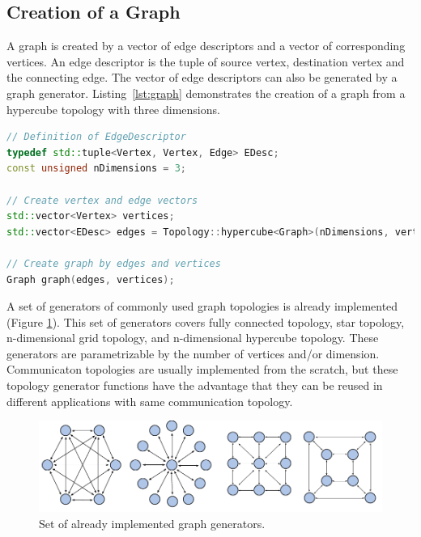 \subsection{Creation of a Graph}
A graph is created by a vector of edge descriptors and a vector of
corresponding vertices. An edge descriptor is the tuple of source
vertex, destination vertex and the connecting edge. The vector of edge
descriptors can also be generated by a graph
generator. Listing~\ref{lst:graph} demonstrates the creation of a graph from
a hypercube topology with three dimensions.

\begin{lstlisting}[language=C++, label=lst:graph, caption={\ }]
// Definition of EdgeDescriptor
typedef std::tuple<Vertex, Vertex, Edge> EDesc;
const unsigned nDimensions = 3;

// Create vertex and edge vectors
std::vector<Vertex> vertices;
std::vector<EDesc> edges = Topology::hypercube<Graph>(nDimensions, vertices);

// Create graph by edges and vertices
Graph graph(edges, vertices);

\end{lstlisting}

\noindent A set of generators of commonly used graph topologies is
already implemented (Figure \ref{fig:topologies}).  This set of
generators covers fully connected topology, star topology,
n-dimensional grid topology, and n-dimensional hypercube topology.
These generators are parametrizable by the number of vertices and/or
dimension.  Communicaton topologies are usually implemented from the
scratch, but these topology generator functions have the advantage
that they can be reused in different applications with same
communication topology.

\begin{figure}[H]
  \centering
  \includegraphics[width=\textwidth]{graphics/40_topologies}
  \caption{Set of already implemented graph generators.}
  \label{fig:topologies}
\end{figure}

